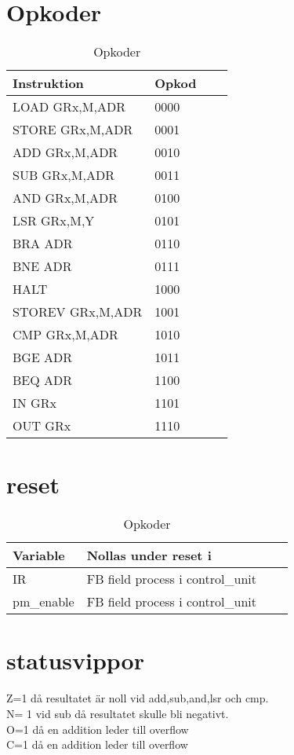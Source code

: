 \documentclass[titlepage, a4paper]{article}
\begin{document}
\section{Opkoder}
\begin{table}[H]
  \centering
  \begin{tabular}{|l|l|l|l|}
    \hline
    \textbf{Instruktion} & \textbf{Opkod}  \\ \hline
  LOAD GRx,M,ADR & 0000  \\ \hline
   STORE GRx,M,ADR & 0001 \\ \hline
    ADD GRx,M,ADR & 0010\\ \hline
     SUB GRx,M,ADR & 0011  \\ \hline
      AND GRx,M,ADR & 0100 \\ \hline
       LSR GRx,M,Y & 0101 \\ \hline
        BRA ADR & 0110 \\ \hline
         BNE ADR & 0111 \\ \hline
          HALT  & 1000 \\ \hline
          STOREV GRx,M,ADR &1001  \\ \hline
     		CMP GRx,M,ADR & 1010 \\ \hline
     		BGE ADR & 1011 \\ \hline
     		BEQ ADR & 1100  \\ \hline
     		IN GRx & 1101  \\ \hline
     		OUT GRx & 1110 \\ \hline
  \end{tabular}
  \caption{Opkoder}

\end{table}

\section{reset}
\begin{table}[H]
  \centering
  \begin{tabular}{|l|l|l|l|}
    \hline
    \textbf{Variable} & \textbf{Nollas under reset i}  \\ \hline
  IR & FB field process i control\_unit  \\ \hline
  
  pm\_enable & FB field process i control\_unit  \\ \hline
  \end{tabular}
  \caption{Opkoder}

\end{table}

\section{statusvippor}

Z=1 då resultatet är noll vid add,sub,and,lsr och cmp.\\
N= 1 vid sub då resultatet skulle bli negativt.\\
O=1 då en addition leder till overflow\\
C=1 då en addition leder till overflow
\end{document}
